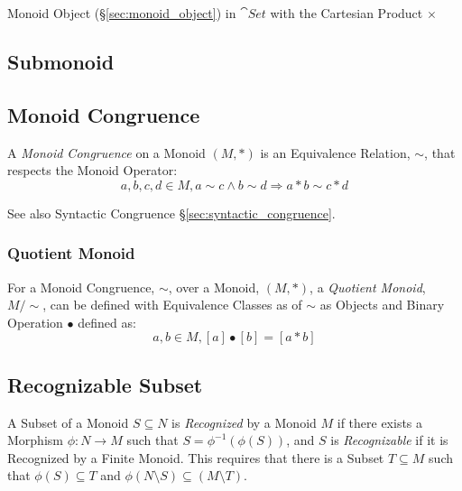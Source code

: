 Monoid Object (\S\ref{sec:monoid_object}) in $\cat{Set}$ with the
Cartesian Product $\times$



\subsection{Submonoid}\label{sec:submonoid}

\subsection{Monoid Congruence}\label{sec:monoid_congruence}

A \emph{Monoid Congruence} on a Monoid $(M,*)$ is an Equivalence
Relation, $\sim$, that respects the Monoid Operator:
\[
  a,b,c,d \in M, a \sim c \wedge b \sim d \Rightarrow a*b \sim c*d
\]

See also Syntactic Congruence \S\ref{sec:syntactic_congruence}.



\subsubsection{Quotient Monoid}\label{sec:quotient_monoid}

For a Monoid Congruence, $\sim$, over a Monoid, $(M,*)$, a
\emph{Quotient Monoid}, $M/\sim$, can be defined with Equivalence
Classes as of $\sim$ as Objects and Binary Operation $\bullet$ defined
as:
\[
  a,b \in M, [a]\bullet[b] = [a*b]
\]



\subsection{Recognizable Subset}\label{sec:recognizable}

A Subset of a Monoid $S \subseteq N$ is \emph{Recognized} by a Monoid
$M$ if there exists a Morphism $\phi : N \rightarrow M$ such that $S =
\phi^{-1}(\phi(S))$, and $S$ is \emph{Recognizable} if it is
Recognized by a Finite Monoid. This requires that there is a Subset $T
\subseteq M$ such that $\phi(S) \subseteq T$ and $\phi(N \setminus S)
\subseteq (M \setminus T)$.

